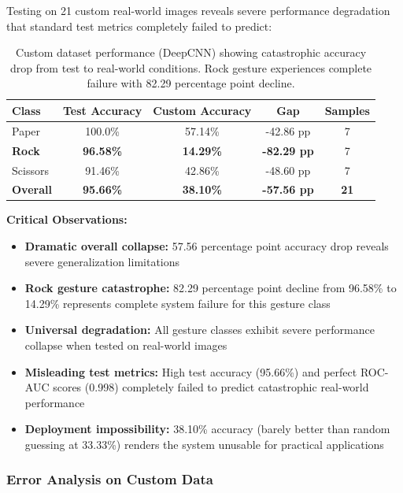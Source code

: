 \documentclass[12pt,a4paper]{article}
\begin{document}
Testing on 21 custom real-world images reveals severe performance degradation that standard test metrics completely failed to predict:

\begin{table}[H]
\centering
\begin{tabular}{lcccc}
\toprule
\textbf{Class} & \textbf{Test Accuracy} & \textbf{Custom Accuracy} & \textbf{Gap} & \textbf{Samples} \\
\midrule
Paper & 100.0\% & 57.14\% & -42.86 pp & 7 \\
\textbf{Rock} & \textbf{96.58\%} & \textbf{14.29\%} & \textbf{-82.29 pp} & 7 \\
Scissors & 91.46\% & 42.86\% & -48.60 pp & 7 \\
\midrule
\textbf{Overall} & \textbf{95.66\%} & \textbf{38.10\%} & \textbf{-57.56 pp} & \textbf{21} \\
\bottomrule
\end{tabular}
\caption{Custom dataset performance (DeepCNN) showing catastrophic accuracy drop from test to real-world conditions. Rock gesture experiences complete failure with 82.29 percentage point decline.}
\label{tab:custom_performance}
\end{table}

\textbf{Critical Observations:}

\begin{itemize}
    \item \textbf{Dramatic overall collapse:} 57.56 percentage point accuracy drop reveals severe generalization limitations
    \item \textbf{Rock gesture catastrophe:} 82.29 percentage point decline from 96.58\% to 14.29\% represents complete system failure for this gesture class
    \item \textbf{Universal degradation:} All gesture classes exhibit severe performance collapse when tested on real-world images
    \item \textbf{Misleading test metrics:} High test accuracy (95.66\%) and perfect ROC-AUC scores (0.998) completely failed to predict catastrophic real-world performance
    \item \textbf{Deployment impossibility:} 38.10\% accuracy (barely better than random guessing at 33.33\%) renders the system unusable for practical applications
\end{itemize}

\subsubsection{Error Analysis on Custom Data}
\end{document}

